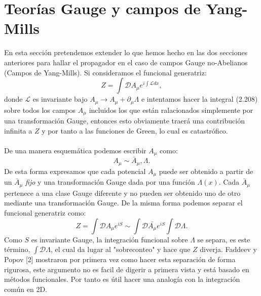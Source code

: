 \section{Teorías Gauge y campos de Yang-Mills}
En esta sección pretendemos extender lo que hemos hecho en las dos secciones anteriores para hallar el propagador en el caso de campos Gauge no-Abelianos (Campos de Yang-Mills). Si consideramos el funcional generatriz:
\begin{equation}
Z=\int\mathcal{D}A_{\mu}e^{i\int\mathcal{L}dx},
\end{equation}
donde $\mathcal{L}$ es invariante bajo $A_\mu \to A_\mu+\partial_\mu\Lambda$ e intentamos hacer la integral (2.208) sobre todos los campos $A_\mu$ incluidos los que están ralacionados simplemente por una transformación Gauge, entonces esto obviamente traerá una contribución infinita a $Z$ y por tanto a las funciones de Green, lo cual es catastrófico.
\\
\\
De una manera esquemática podemos escribir $A_\mu$ como:
\begin{equation}
A_\mu\sim \bar{A}_\mu, \Lambda .
\end{equation}
De esta forma expresamos que cada potencial $A_\mu$ puede ser obtenido a partir de un $\bar{A}_\mu$ \textit{fijo} y una transformación Gauge dada por una función $\Lambda(x)$. Cada $\bar{A}_\mu$ pertenece a una clase Gauge diferente y no pueden ser obtenido uno de otro mediante una transformación Gauge. De la misma forma podemos separar el funcional generatriz como:
\begin{equation}
Z=\int\mathcal{D}A_{\mu}e^{iS}\sim\int\mathcal{D}\bar{A_{\mu}}e^{iS}\int\mathcal{D}\Lambda .
\end{equation}  	  	
Como $S$ es invariante Gauge, la integración funcional sobre $\Lambda$ se separa, es este término, $\int \mathcal{D}\Lambda$, el cual da lugar al "sobreconteo" y hace que $Z$ diverja. Faddeev y Popov [2] mostraron por primera vez como hacer esta separación de forma rigurosa, este argumento no es facil de digerir a primera vista y está basado en métodos funcionales. Por tanto es útil hacer una analogía con la integración común en 2D.
 		



